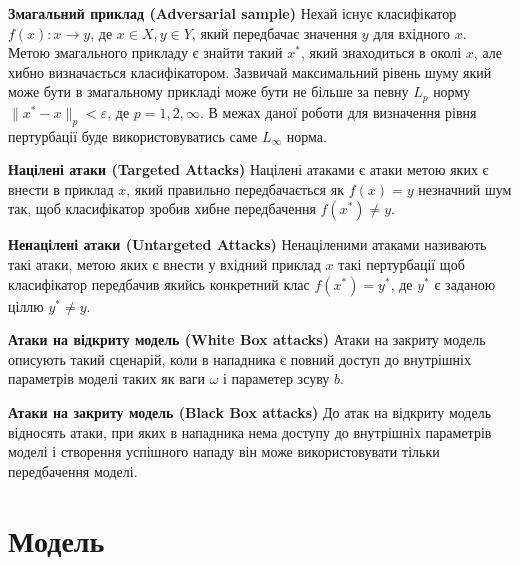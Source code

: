 \documentclass[a4paper,14pt]{extreport}
\begin{document}
	\textbf{Змагальний приклад (Adversarial sample)}
	\newline
	Нехай існує класифікатор $f(x):x\rightarrow y$, де  $x \in X, y \in Y$, який передбачає значення $y$ для вхідного $x$. Метою змагального прикладу є знайти такий $x^{*}$, який знаходиться в околі $x$, але хибно визначається класифікатором. Зазвичай максимальний рівень шуму який може бути в змагальному прикладі може бути не більше за певну $L_p$ норму $ \| x^{*} - x \|_p < \varepsilon $, де $p=1,2,\infty $. В межах даної роботи для визначення рівня пертурбації буде використовуватись саме $L_{\infty}$ норма.
	\newline \par
	\textbf{Націлені атаки (Targeted Attacks)} \newline
	Націлені атаками є атаки метою яких є внести в приклад $x$, який правильно передбачається як $f(x) = y$ незначний шум так, щоб класифікатор зробив хибне передбачення $f(x^{*}) \neq y$.
	\newline \par
	\textbf{Ненацілені атаки (Untargeted Attacks)} \newline
	Ненаціленими атаками називають такі атаки, метою яких є внести у вхідний приклад $x$ такі пертурбації щоб класифікатор передбачив якийсь конкретний клас $f(x^{*}) = y^{*}$, де $y^{*}$ є заданою ціллю $y^{*} \neq y$.
	\newline \par
	\textbf{Атаки на відкриту модель (White Box attacks)} \newline
	Атаки на закриту модель описують такий сценарій, коли в нападника є повний доступ до внутрішніх параметрів моделі таких як ваги $\omega$ і параметер зсуву $b$.
	\newline \par
	\textbf{Атаки на закриту модель (Black Box attacks)} \newline
	До атак на відкриту модель відносять атаки, при яких в нападника нема доступу до внутрішніх параметрів моделі і створення успішного нападу він може використовувати тільки передбачення моделі.


	\chapter{Модель}
	
\end{document}
